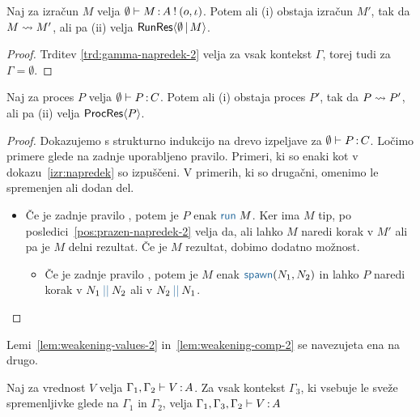 \begin{posledica}[o napredku]\label{pos:prazen-napredek-2}
	Naj za izračun $M$ velja $\emptyset \vdash M \mathinner{:} A \mathbin{!} (o, \iota)$. Potem ali (i) obstaja izračun $M'$, tak da $M \leadsto M'$, ali pa (ii) velja $\mathsf{RunRes}\langle\emptyset \,\vert\, M\rangle$.
\end{posledica}

\begin{proof}
	Trditev \ref{trd:gamma-napredek-2} velja za vsak kontekst $\Gamma$, torej tudi za $\Gamma = \emptyset$.
\end{proof}


\begin{izrek}[o napredku]
	Naj za proces $P$ velja $\emptyset \vdash P \mathinner{:} C$. Potem ali (i) obstaja proces $P'$, tak da $P \leadsto P'$, ali pa (ii) velja $\mathsf{ProcRes}\langle P \rangle$.
\end{izrek}

\begin{proof}
	Dokazujemo s strukturno indukcijo na drevo izpeljave za $\emptyset \vdash P \mathinner{:} C$.
	Ločimo primere glede na zadnje uporabljeno pravilo.
	Primeri, ki so enaki kot v dokazu~\ref{izr:napredek} so izpuščeni. V primerih, ki so drugačni, omenimo le spremenjen ali dodan del.
	
	\begin{itemize}
		\item Če je zadnje pravilo , potem je $P$ enak $\tmrun{M}$. Ker ima $M$ tip, po posledici~\ref{pos:prazen-napredek-2} velja da, ali lahko $M$ naredi korak v $M'$ ali pa je $M$ delni rezultat.
		Če je $M$ rezultat, dobimo dodatno možnost.
		\begin{itemize}
			\item Če je zadnje pravilo , potem je $M$ enak $\tmspawn{N_1}{N_2}$ in lahko $P$ naredi korak v $\tmpar{N_1}{N_2}$ ali v $\tmpar{N_2}{N_1}$.
		\end{itemize}		
	\end{itemize}
\end{proof}

Lemi~\ref{lem:weakening-values-2} in~\ref{lem:weakening-comp-2} se navezujeta ena na drugo.

\begin{lema}\label{lem:weakening-values-2}
	Naj za vrednost $V$ velja $\Gamma_1, \Gamma_2 \vdash V \mathinner{:} A$. Za vsak kontekst $\Gamma_3$, ki vsebuje le sveže spremenljivke glede na $\Gamma_1$ in $\Gamma_2$, velja $\Gamma_1, \Gamma_3, \Gamma_2 \vdash V \mathinner{:} A$
\end{lema}

